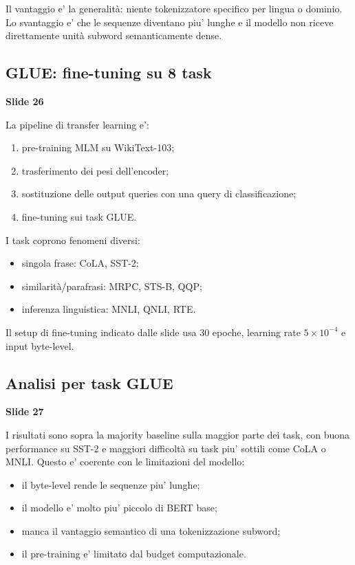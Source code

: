 \documentclass[11pt,a4paper]{article}
\newcommand{\slide}[1]{\textcolor{mainblue}{\textbf{Slide #1}}}
\begin{document}
Il vantaggio e' la generalit\`a: niente tokenizzatore specifico per lingua o
dominio. Lo svantaggio e' che le sequenze diventano piu' lunghe e il modello
non riceve direttamente unit\`a subword semanticamente dense.

\subsection{GLUE: fine-tuning su 8 task}
\slide{26}

La pipeline di transfer learning e':
\begin{enumerate}
  \item pre-training MLM su WikiText-103;
  \item trasferimento dei pesi dell'encoder;
  \item sostituzione delle output queries con una query di classificazione;
  \item fine-tuning sui task GLUE.
\end{enumerate}

I task coprono fenomeni diversi:
\begin{itemize}
  \item singola frase: CoLA, SST-2;
  \item similarit\`a/parafrasi: MRPC, STS-B, QQP;
  \item inferenza linguistica: MNLI, QNLI, RTE.
\end{itemize}

Il setup di fine-tuning indicato dalle slide usa $30$ epoche, learning rate
$5 \times 10^{-4}$ e input byte-level.

\subsection{Analisi per task GLUE}
\slide{27}

I risultati sono sopra la majority baseline sulla maggior parte dei task, con
buona performance su SST-2 e maggiori difficolt\`a su task piu' sottili come
CoLA o MNLI. Questo e' coerente con le limitazioni del modello:
\begin{itemize}
  \item il byte-level rende le sequenze piu' lunghe;
  \item il modello e' molto piu' piccolo di BERT base;
  \item manca il vantaggio semantico di una tokenizzazione subword;
  \item il pre-training e' limitato dal budget computazionale.
\end{itemize}
\end{document}
